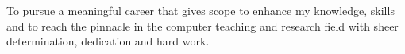 
\begin{cventries}
	\cvobjective
	{To pursue a meaningful career that gives scope to enhance my knowledge, skills and to reach the pinnacle in the computer teaching and research field with sheer determination, dedication and hard work.}	
\end{cventries}